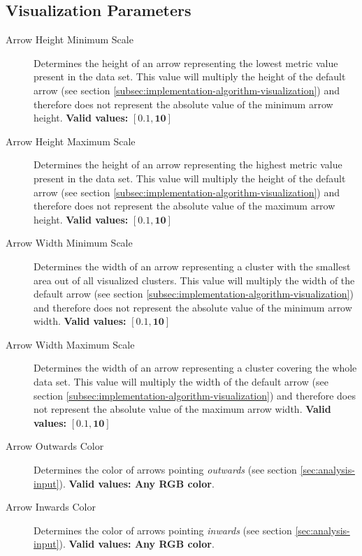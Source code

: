 \subsection{Visualization Parameters}
\label{attch:parameter_desc-visualization_parameters}

\begin{description}
\item [Arrow Height Minimum Scale] Determines the height of an arrow representing the lowest metric value present in the data set. This value will multiply the height of the default arrow (see section \ref{subsec:implementation-algorithm-visualization}) and therefore does not represent the absolute value of the minimum arrow height. {\bf Valid values:} \(\bm{[0.1,10]}\)

\item [Arrow Height Maximum Scale] Determines the height of an arrow representing the highest metric value present in the data set. This value will multiply the height of the default arrow (see section \ref{subsec:implementation-algorithm-visualization}) and therefore does not represent the absolute value of the maximum arrow height. {\bf Valid values:} \(\bm{[0.1,10]}\)

\item [Arrow Width Minimum Scale] Determines the width of an arrow representing a cluster with the smallest area out of all visualized clusters. This value will multiply the width of the default arrow (see section \ref{subsec:implementation-algorithm-visualization}) and therefore does not represent the absolute value of the minimum arrow width. {\bf Valid values:} \(\bm{[0.1,10]}\)

\item [Arrow Width Maximum Scale] Determines the width of an arrow representing a cluster covering the whole data set. This value will multiply the width of the default arrow (see section \ref{subsec:implementation-algorithm-visualization}) and therefore does not represent the absolute value of the maximum arrow width. {\bf Valid values:} \(\bm{[0.1,10]}\)

\item [Arrow Outwards Color] Determines the color of arrows pointing {\it outwards} (see section \ref{sec:analysis-input}). {\bf Valid values: Any RGB color}.

\item [Arrow Inwards Color] Determines the color of arrows pointing {\it inwards} (see section \ref{sec:analysis-input}). {\bf Valid values: Any RGB color}.


\end{description}
